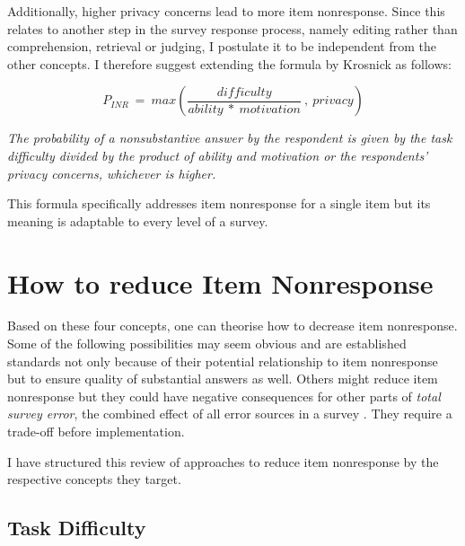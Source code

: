 \documentclass[a4paper,12pt]{article}
\begin{document}
Additionally, higher privacy concerns lead to more item nonresponse. Since this relates to another step in the survey response process, namely editing rather than comprehension, retrieval or judging, I postulate it to be independent from the other concepts. I therefore suggest extending the formula by Krosnick as follows:

$$ P_{INR} \ = \ max \left( \frac{difficulty}{ability \ * \ motivation} \ , \ privacy \right) $$

\textit{The probability of a nonsubstantive answer by the respondent is given by the task difficulty
divided by the product of ability and motivation or the respondents' privacy concerns, whichever
is higher.}

This formula specifically addresses item nonresponse for a single item but its meaning is adaptable to every level of a survey.


\section{How to reduce Item Nonresponse}

Based on these four concepts, one can theorise how to decrease item nonresponse. Some of the following possibilities may seem obvious and are established standards not only because of their potential relationship to item nonresponse but to ensure quality of substantial answers as well. Others might reduce item nonresponse but they could have negative consequences for other parts of \textit{total survey error}, the combined effect of all error sources in a survey \citep{grovesTotalSurveyError2010}. They require a trade-off before implementation.

I have structured this review of approaches to reduce item nonresponse by the respective concepts they target.

\subsection{Task Difficulty}
\end{document}
